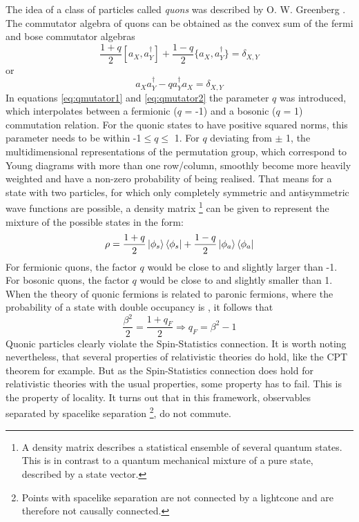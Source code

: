 The idea of a class of particles called \textit{quons} was described by O. W. Greenberg \cite{Greenberg1991}.  The commutator algebra of quons can be obtained as the convex sum of the fermi and bose commutator algebras
\begin{equation}
\label{eq:qmutator1}
 \frac{1+q}{2}[a_{X},a_{Y}^{\dag}]+\frac{1-q}{2}\{a_{X},a_{Y}^{\dag}\} = \delta_{X,Y}
\end{equation} 
or 
\begin{equation}
\label{eq:qmutator2}
 a_{X}a_{Y}^{\dag} - q a_{Y}^{\dag} a_{X} = \delta_{X,Y}
\end{equation} 
In equations \ref{eq:qmutator1} and \ref{eq:qmutator2} the parameter $q$ was introduced, which interpolates between a fermionic ($q$ = -1) and a bosonic ($q$ = 1) commutation relation. For the quonic states to have positive squared norms, this parameter needs to be within -1$\leq q \leq$ 1. For $q$ deviating from $\pm$ 1, the multidimensional representations of the permutation group, which correspond to Young diagrams with more than one row/column, smoothly become more heavily weighted and have a non-zero probability of being realised. That means for a state with two particles, for which only completely symmetric and antisymmetric wave functions are possible, a density matrix \footnote{A density matrix describes a statistical ensemble of several quantum states. This is in contrast to a quantum mechanical mixture of a pure state, described by a state vector.} can be given to represent the mixture of the possible states in the form:
\begin{equation}
 \rho = \frac{1+q}{2}\ket{\phi_{s}}\bra{\phi_{s}} + \frac{1-q}{2}\ket{\phi_{a}}\bra{\phi_{a}}
\end{equation} 
For fermionic quons, the factor $q$ would be close to and slightly larger than -1. For bosonic quons, the factor $q$ would be close to and slightly smaller than 1. When the theory of quonic fermions is related to paronic fermions, where the probability of a state with double occupancy is \betatwo, it follows that
\begin{equation}
 \frac{\beta^{2}}{2} = \frac{1+q_{F}}{2} \Rightarrow q_{F} = \beta^{2} - 1
\end{equation} 
Quonic particles clearly violate the Spin-Statistics connection. It is worth noting nevertheless, that several properties of relativistic theories do hold, like the CPT theorem for example. But as the Spin-Statistics connection does hold for relativistic theories with the usual properties, some property has to fail. This is the property of locality. It turns out that in this framework, observables separated by spacelike separation \footnote{Points with spacelike separation are not connected by a lightcone and are therefore not causally connected.}, do not commute.


